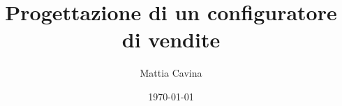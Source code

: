 \documentclass[12pt,a4paper,openright,twoside]{book}
\title{Progettazione di un configuratore di vendite}
\author{Mattia Cavina}
\date{\today}
\begin{document}
\frontmatter\frontispiece{}




\tableofcontents
\listoffigures     %
\lstlistoflistings{}  %
\listoftables      %

\mainmatter{}




























\appendix





\end{document}
